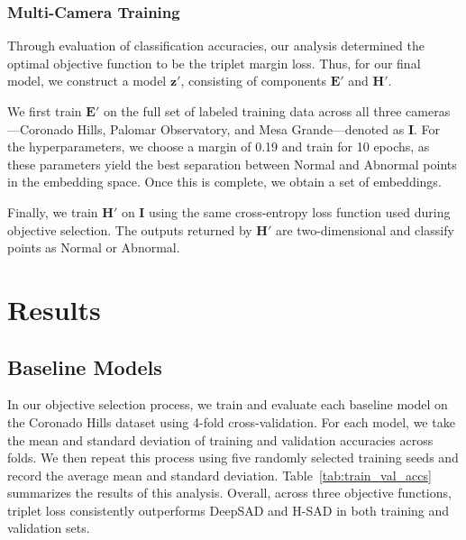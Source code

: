 \documentclass[remotesensing,article,submit,moreauthors]{Definitions/mdpi}
\begin{document}
\subsubsection{Multi-Camera Training}

Through evaluation of classification accuracies, our analysis determined the optimal objective function to be the triplet margin loss. Thus, for our final model, we construct a model $\mathbf{z'}$, consisting of components $\mathbf{E'}$ and $\mathbf{H'}$.

We first train $\mathbf{E'}$ on the full set of labeled training data across all three cameras—Coronado Hills, Palomar Observatory, and Mesa Grande—denoted as $\mathbf{I}$. For the hyperparameters, we choose a margin of 0.19 and train for 10 epochs, as these parameters yield the best separation between Normal and Abnormal points in the embedding space. Once this is complete, we obtain a set of embeddings. 

Finally, we train $\mathbf{H'}$ on $\mathbf{I}$ using the same cross-entropy loss function used during objective selection. The outputs returned by $\mathbf{H'}$ are two-dimensional and classify points as Normal or Abnormal.

\section{Results}
\label{sec:results}

\subsection{Baseline Models}
In our objective selection process, we train and evaluate each baseline model on the Coronado Hills dataset using 4-fold cross-validation. For each model, we take the mean and standard deviation of training and validation accuracies across folds. We then repeat this process using five randomly selected training seeds and record the average mean and standard deviation. Table~\ref{tab:train_val_accs} summarizes the results of this analysis. Overall, across three objective functions, triplet loss consistently outperforms \ac{DeepSAD} and \ac{H-SAD} in both training and validation sets. 
\end{document}
